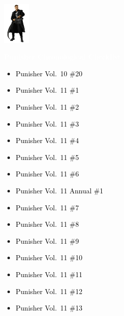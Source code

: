\documentclass[12pt]{article}
\newcommand{\checkbox}{\raisebox{0.0ex}{\fbox{\rule{0ex}{1.5ex} \rule{1.5ex}{0ex}}}}
\begin{document}
\begin{center}
    \vspace*{2cm}
    \includegraphics[width=0.1\textwidth]{PUNISHER1.PNG}
    \vspace{0.3cm}

    {\Huge \textbf{\textcolor{white}{Punisher Chronological Checklist}}}
\end{center}

\vspace{0.3cm}
\noindent
\begin{tcolorbox}[
  colback=white!95!gray,
  colframe=black,
  width=\textwidth,
  arc=4mm,
  auto outer arc,
  boxrule=0.8pt,
  left=8pt,right=8pt,top=8pt,bottom=8pt
]
\begin{itemize}[left=0pt,label={\checkbox}]
    \item \textcolor{black}{Punisher Vol.\ 10 \#20}
    \item \textcolor{black}{Punisher Vol.\ 11 \#1}
    \item \textcolor{black}{Punisher Vol.\ 11 \#2}
    \item \textcolor{black}{Punisher Vol.\ 11 \#3}
    \item \textcolor{black}{Punisher Vol.\ 11 \#4}
    \item \textcolor{black}{Punisher Vol.\ 11 \#5}
    \item \textcolor{black}{Punisher Vol.\ 11 \#6}
    \item \textcolor{black}{Punisher Vol.\ 11 Annual \#1}
    \item \textcolor{black}{Punisher Vol.\ 11 \#7}
    \item \textcolor{black}{Punisher Vol.\ 11 \#8}
    \item \textcolor{black}{Punisher Vol.\ 11 \#9}
    \item \textcolor{black}{Punisher Vol.\ 11 \#10}
    \item \textcolor{black}{Punisher Vol.\ 11 \#11}
    \item \textcolor{black}{Punisher Vol.\ 11 \#12}
    \item \textcolor{black}{Punisher Vol.\ 11 \#13}
\end{itemize}
\end{tcolorbox}
\end{document}
